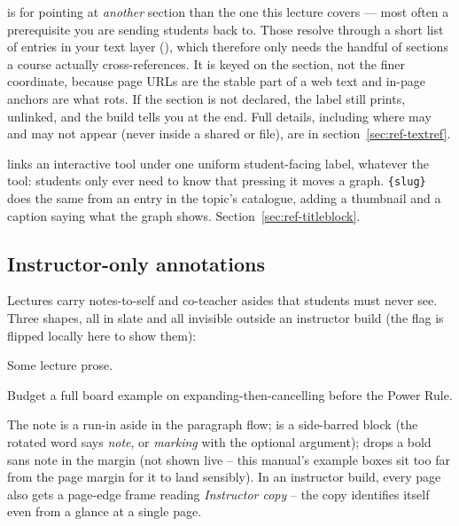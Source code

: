  is for pointing at \emph{another} section than the one this
lecture covers --- most often a prerequisite you are sending students back to.
Those resolve through a short list of  entries in your text
layer (), which therefore only needs the handful
of sections a course actually cross-references. It is keyed on the section,
not the finer coordinate, because page URLs are the stable part of a web text
and in-page anchors are what rots. If the section is not declared, the label
still prints, unlinked, and the build tells you at the end. Full details,
including where  may and may not appear (never inside a shared
 or  file), are in
section~\ref{sec:ref-textref}.

 links an interactive tool under one uniform student-facing label,
whatever the tool: students only ever need to know that pressing it moves a
graph. \texttt{\{slug\}} does the same from an entry in the
topic's  catalogue, adding a thumbnail and a caption
saying what the graph shows. Section~\ref{sec:ref-titleblock}.

\subsection{Instructor-only annotations}

Lectures carry notes-to-self and co-teacher asides that students must never
see. Three shapes, all in slate and all invisible outside an instructor build
(the flag is flipped locally here to show them):

\begin{manexample}
\instructornotestrue
Some lecture prose.

\begin{InstructorBox}[marking]
  Budget a full board example on expanding-then-cancelling
  before the Power Rule.
\end{InstructorBox}
\end{manexample}

The  note is a run-in aside in the paragraph flow;
 is a side-barred block (the rotated word says \emph{note},
or \emph{marking} with the optional argument);  drops a
bold sans note in the margin (not shown live -- this manual's example boxes
sit too far from the page margin for it to land sensibly). In an instructor
build, every page also gets a page-edge frame reading \emph{Instructor copy}
-- the copy identifies itself even from a glance at a single page.

